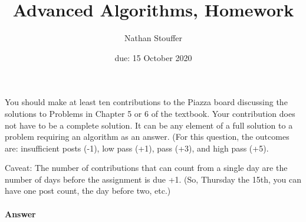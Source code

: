 \documentclass{article}
\title{Advanced Algorithms, Homework \hwnum}
\author{Nathan Stouffer}
\date{due: 15 October 2020}
\begin{document}
\maketitle

\nextprob
{}

You should make at least ten contributions to the Piazza board
discussing the solutions to Problems in Chapter 5 or 6 of the textbook.  Your
contribution does not have to be a complete solution.  It can be any element of
a full solution to a problem requiring an algorithm as an answer.  (For this
question, the outcomes are: insufficient posts (-1), low pass (+1), pass (+3),
and high pass (+5).

Caveat: The number of contributions that can count from a single day are the
number of days before the assignment is due +1.  (So, Thursday the 15th, you can
have one post count, the day before two, etc.)

\paragraph{Answer}

\end{document}
